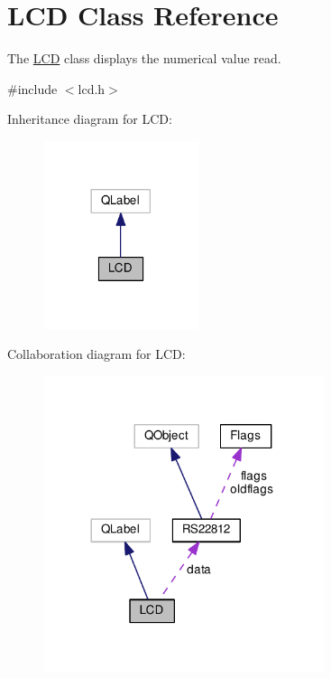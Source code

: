 \hypertarget{class_l_c_d}{\section{L\-C\-D Class Reference}
\label{class_l_c_d}
}


The \hyperlink{class_l_c_d}{L\-C\-D} class displays the numerical value read.  




{\ttfamily \#include $<$lcd.\-h$>$}



Inheritance diagram for L\-C\-D\-:\nopagebreak
\begin{figure}[H]
\begin{center}
\leavevmode
\includegraphics[width=129pt]{class_l_c_d__inherit__graph}
\end{center}
\end{figure}


Collaboration diagram for L\-C\-D\-:
\nopagebreak
\begin{figure}[H]
\begin{center}
\leavevmode
\includegraphics[width=233pt]{class_l_c_d__coll__graph}
\end{center}
\end{figure}
